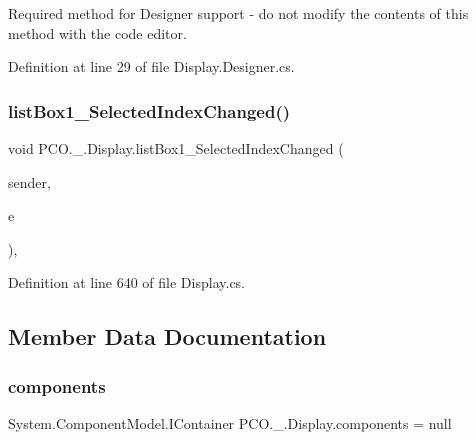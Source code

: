 Required method for Designer support -\/ do not modify the contents of this method with the code editor. 



Definition at line 29 of file Display.\+Designer.\+cs.

\mbox{\label{classPCO_1_1__0_1_1Display_a79a83d7954cbce514cdaa8336a5af2b8}} 
\subsubsection{\texorpdfstring{list\+Box1\+\_\+\+Selected\+Index\+Changed()}{listBox1\_SelectedIndexChanged()}}
{\footnotesize\ttfamily void P\+C\+O.\+\_.\+Display.\+list\+Box1\+\_\+\+Selected\+Index\+Changed (\begin{DoxyParamCaption}\item[{object}]{sender,  }\item[{Event\+Args}]{e }\end{DoxyParamCaption})\hspace{0.3cm}{\ttfamily [inline]}, {\ttfamily [private]}}



Definition at line 640 of file Display.\+cs.



\subsection{Member Data Documentation}
\mbox{\label{classPCO_1_1__0_1_1Display_a85da09902d8b1e0f454a66ad815d6090}} 
\subsubsection{\texorpdfstring{components}{components}}
{\footnotesize\ttfamily System.\+Component\+Model.\+I\+Container P\+C\+O.\+\_.\+Display.\+components = null\hspace{0.3cm}{\ttfamily [private]}}



